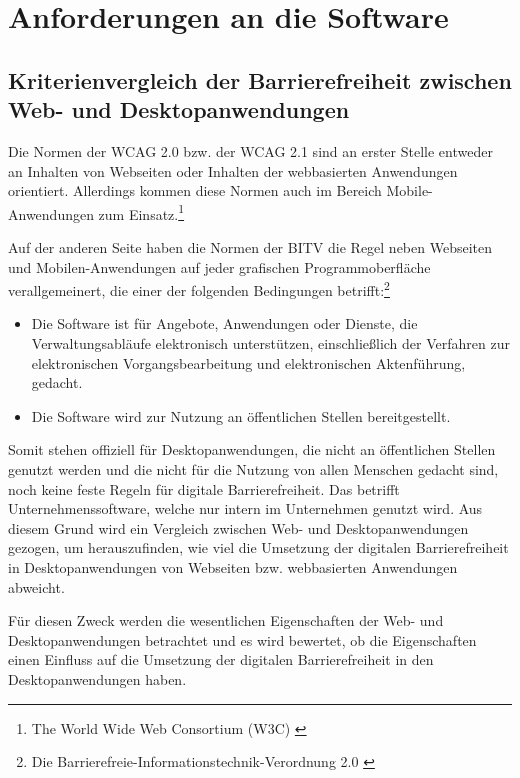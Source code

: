 \section{Anforderungen an die Software}

\subsection{Kriterienvergleich der Barrierefreiheit zwischen Web- und Desktopanwendungen}
\label{subsec: Kriterienvergleich der Barrierefreiheit zwischen Web- und Desktopanwendungen}

Die Normen der \ac{WCAG} 2.0 bzw. der \ac{WCAG} 2.1 sind an erster Stelle entweder an Inhalten von Webseiten oder Inhalten der webbasierten Anwendungen orientiert. Allerdings kommen diese Normen auch im Bereich Mobile-Anwendungen zum Einsatz.\footnote{The World Wide Web Consortium (W3C) \cite{w3c}}

Auf der anderen Seite haben die Normen der \ac{BITV} die Regel neben Webseiten und Mobilen-Anwendungen auf jeder grafischen Programmoberfläche verallgemeinert, die einer der folgenden Bedingungen betrifft:\footnote{Die Barrierefreie-Informationstechnik-Verordnung 2.0 \cite{BITV}}

\begin{itemize}
	\item Die Software ist für Angebote, Anwendungen oder Dienste, die Verwaltungsabläufe elektronisch unterstützen, einschließlich der Verfahren zur elektronischen Vorgangsbearbeitung 
	und elektronischen Aktenführung, gedacht.
	\item Die Software wird zur Nutzung an öffentlichen Stellen bereitgestellt.
\end{itemize}

Somit stehen offiziell für Desktopanwendungen, die nicht an öffentlichen Stellen genutzt werden und die nicht für die Nutzung von allen Menschen gedacht sind, noch keine feste Regeln für digitale Barrierefreiheit. Das betrifft Unternehmenssoftware, welche nur intern im Unternehmen genutzt wird. Aus diesem Grund wird ein Vergleich zwischen Web- und Desktopanwendungen gezogen, um herauszufinden, wie viel die Umsetzung der digitalen Barrierefreiheit in Desktopanwendungen von Webseiten bzw. webbasierten Anwendungen abweicht.

Für diesen Zweck werden die wesentlichen Eigenschaften der Web- und Desktopanwendungen betrachtet und es wird bewertet, ob die Eigenschaften einen Einfluss auf die Umsetzung der digitalen Barrierefreiheit in den Desktopanwendungen haben.

